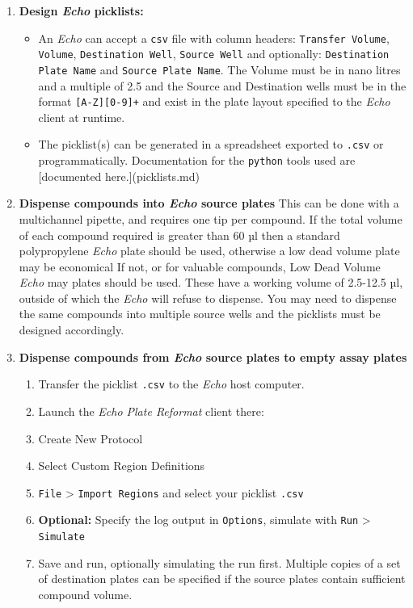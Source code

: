 \documentclass[16pt]{book}
\begin{document}
\begin{enumerate}
	\item \textbf{Design \textit{Echo} picklists:}
	\begin{itemize}
		\item An \textit{Echo} can accept a \texttt{csv} file with column headers: \texttt{Transfer Volume}, \texttt{Volume}, \texttt{Destination Well}, \texttt{Source Well} and optionally: \texttt{Destination Plate Name} and \texttt{Source Plate Name}.
			The Volume must be in nano litres and a multiple of 2.5 and the Source and Destination wells must be in the format \texttt{[A-Z][0-9]+} and exist in the plate layout specified to the \textit{Echo} client at runtime.

		\item The picklist(s) can be generated in a spreadsheet exported to \texttt{.csv} or programmatically.
			Documentation for the \texttt{python} tools used are [documented here.](picklists.md)
	\end{itemize}
\item \textbf{Dispense compounds into \textit{Echo} source plates}
	This can be done with a multichannel pipette, and requires one tip per compound. 
		If the total volume of each compound required is greater than 60 µl then a standard polypropylene \textit{Echo} plate should be used, otherwise a low dead volume plate may be economical
		If not, or for valuable compounds, Low Dead Volume \textit{Echo} may plates should be used.
		These have a working volume of 2.5-12.5 µl, outside of which the \textit{Echo} will refuse to dispense.
	You may need to dispense the same compounds into multiple source wells and the picklists must be designed accordingly.

\item \textbf{Dispense compounds from \textit{Echo} source plates to empty assay plates}
		\begin{enumerate}
			\item Transfer the picklist \texttt{.csv} to the \textit{Echo} host computer.
			\item Launch the \textit{Echo Plate Reformat} client there:
			\item Create New Protocol 
			\item Select Custom Region Definitions
			\item \texttt{File} > \texttt{Import Regions} and select your picklist \texttt{.csv}
			\item \textbf{Optional:} Specify the log output in \texttt{Options}, simulate with \texttt{Run} > \texttt{Simulate} 
			\item Save and run, optionally simulating the run first. 
			Multiple copies of a set of destination plates can be specified if the source plates contain sufficient compound volume.
		\end{enumerate}


\end{enumerate}
\end{document}

